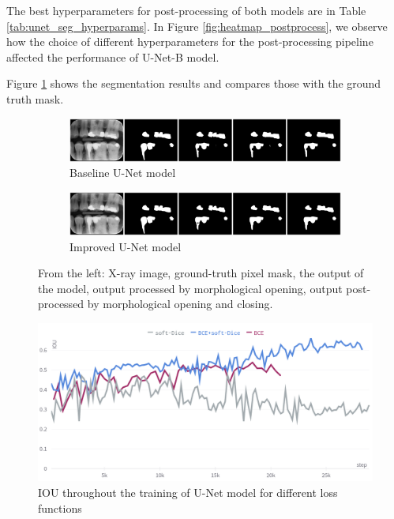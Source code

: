 The best hyperparameters for post-processing of both models are in Table \ref{tab:unet_seg_hyperparams}. In Figure \ref{fig:heatmap_postprocess}, we observe how the choice of different hyperparameters for the post-processing pipeline affected the performance of U-Net-B model.

Figure \ref{fig:segmentation_unet_sample} shows the segmentation results and compares those with the ground truth mask.

\begin{figure}[h]
    \centering
    \begin{subfigure}[b]{\textwidth}
        \includegraphics[width=1\linewidth]{images/unet_1_img_12.pdf}
        \caption{Baseline U-Net model}
    \end{subfigure}

    \begin{subfigure}[b]{\textwidth}
        \includegraphics[width=1\linewidth]{images/unet_2_img_12.pdf}
        \caption{Improved U-Net model}
    \end{subfigure}
    \caption{From the left: X-ray image, ground-truth pixel mask, the output of the model, output processed by morphological opening, output post-processed by morphological opening and closing.}
    \label{fig:segmentation_unet_sample}
\end{figure}
\begin{figure}
    \centering
    \includegraphics[width=0.8\linewidth]{images/segmentation_losses.png}
    \caption{IOU throughout the training of U-Net model for different loss functions}
    \label{fig:segmentation_losses}
\end{figure}


